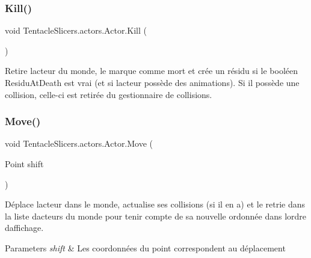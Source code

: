 \subsubsection{\texorpdfstring{Kill()}{Kill()}}
{\footnotesize\ttfamily void Tentacle\+Slicers.\+actors.\+Actor.\+Kill (\begin{DoxyParamCaption}{ }\end{DoxyParamCaption})}



Retire l\textquotesingle{}acteur du monde, le marque comme mort et crée un résidu si le booléen Residu\+At\+Death est vrai (et si l\textquotesingle{}acteur possède des animations). Si il possède une collision, celle-\/ci est retirée du gestionnaire de collisions. 

\mbox{\label{class_tentacle_slicers_1_1actors_1_1_actor_ae52e3a2860b172692699d30c0f634041}} 
\subsubsection{\texorpdfstring{Move()}{Move()}}
{\footnotesize\ttfamily void Tentacle\+Slicers.\+actors.\+Actor.\+Move (\begin{DoxyParamCaption}\item[{Point}]{shift }\end{DoxyParamCaption})}



Déplace l\textquotesingle{}acteur dans le monde, actualise ses collisions (si il en a) et le retrie dans la liste d\textquotesingle{}acteurs du monde pour tenir compte de sa nouvelle ordonnée dans l\textquotesingle{}ordre d\textquotesingle{}affichage. 


\begin{DoxyParams}{Parameters}
{\em shift} & Les coordonnées du point correspondent au déplacement \\
\hline
\end{DoxyParams}
\mbox{\label{class_tentacle_slicers_1_1actors_1_1_actor_a780cf5a4c31f30307f67ac0a152ec7c0}} 
